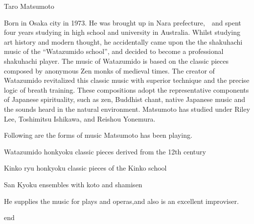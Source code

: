 ﻿Taro Matsumoto

Born in Osaka city in 1973.
He was brought up in Nara prefecture,　and spent four years studying in high school and university in Australia.
Whilst studying art history and modern thought, he accidentally came upon the the shakuhachi music of the “Watazumido school”, and decided to become a professional shakuhachi player. The music of Watazumido is based on the classic pieces composed by anonymous Zen monks of medieval times. The creator of Watazumido revitalized this classic music with superior technique and the precise logic of breath training. These compositions adopt the representative components of  Japanese spirituality, such as zen, Buddhist chant, native Japanese music and the sounds heard in the natural environment. Matsumoto has studied under Riley Lee, Toshimitsu Ishikawa, and Reishou Yonemura. 

Following are the forms of music Matsumoto has been playing. 

Watazumido honkyoku   classic pieces derived from the 12th century

Kinko ryu honkyoku      classic pieces of the Kinko school

San Kyoku               ensembles with koto and shamisen

He supplies the music for plays and operas,and also is an excellent improviser.


                                         end        
